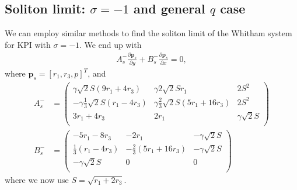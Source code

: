 \documentclass[12pt]{article}
\numberwithin{equation}{section}
\begin{document}
\subsection{Soliton limit: $ \sigma = -1$ and general $q$ case} \label{sec:soliton sig = -1}
We can employ similar methods to find the soliton limit of the Whitham system for KPI with $\sigma = -1$. We end up with 
\begin{align}
    A_{s}^-\frac{\partial \textbf{p}_{s}}{\partial y} + B_{s}^-\frac{\partial \textbf{p}_{s}}{\partial x} =0, \label{vector eq for statKPWS}
\end{align}
where $\textbf{p}_{s} = [r_1,r_3,p]^T$, and 
\begin{align*}
    A_s^- &= \left(
\begin{array}{ccc}
 \gamma\sqrt{2} S (9 r_1+4 r_3) & \gamma2 \sqrt{2} S r_1 & 2 S^2 \\
 -\gamma\frac{1}{3} \sqrt{2} S (r_1-4 r_3) & \gamma\frac{2}{3} \sqrt{2} S (5 r_1+16 r_3) & 2 S^2 \\
 3 r_1+4 r_3 & 2 r_1 & \gamma\sqrt{2} S \\
\end{array}
\right) \\
B_s^- &= \left(
\begin{array}{ccc}
 -5 r_1-8 r_3 & -2 r_1 & -\gamma\sqrt{2} S \\
 \frac{1}{3} (r_1-4 r_3) & -\frac{2}{3} (5 r_1+16 r_3) & -\gamma\sqrt{2} S \\
 -\gamma\sqrt{2} S & 0 & 0 \\
\end{array}
\right)
\end{align*}
where we now use $S = \sqrt{r_1+2r_3}$. 
\end{document}
